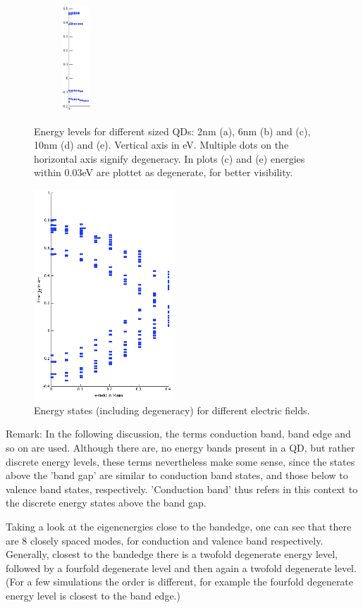 \begin{figure}
\begin{subfigure}{60px}
		\caption{}
	\end{subfigure}    
	\begin{subfigure}{60px}
		\includegraphics[height=150px]{Fig/Plots/r5a.png}
		\caption{}
	\end{subfigure}
	\caption{Energy levels for different sized QDs: 2nm (a), 6nm (b) and (c), 10nm (d) and (e). Vertical axis in eV. Multiple dots on the horizontal axis signify degeneracy. In plots (c) and (e) energies within 0.03eV are plottet as degenerate, for better visibility.}
	\label{fig:e-levels}	
\end{figure}

\begin{figure}
	\centering
	\includegraphics[width=200px]{Fig/Plots/r25v.png}
	\caption{Energy states (including degeneracy) for different electric fields.}
	\label{fig:EvsVolt}
\end{figure}
Remark: In the following discussion, the terms conduction band, band edge and so on are used. Although there are, no energy bands present in a QD, but rather discrete energy levels, these terms nevertheless make some sense, since the states above the 'band gap' are similar to conduction band states, and those below to valence band states, respectively.  'Conduction band' thus refers in this context to the discrete energy states above the band gap.
	
Taking a look at the eigenenergies close to the bandedge, one can see that there are 8 closely spaced modes, for conduction and valence band respectively. Generally, closest to the bandedge there is a twofold degenerate energy level, followed by a fourfold degenerate level and then again a twofold degenerate level. (For a few simulations the order is different, for example the fourfold degenerate energy level is closest to the band edge.)
	
